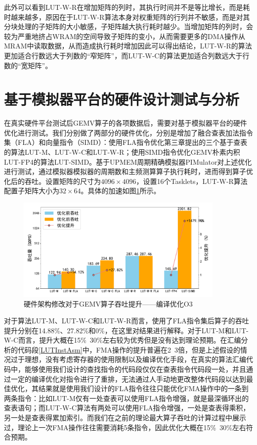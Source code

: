 此外可以看到LUT-W-R在增加矩阵的列时，其执行时间并不是等比增长，而是耗时越来越多，原因在于LUT-W-R算法本身对权重矩阵的行列并不敏感，而是对其分块处理的子矩阵的大小敏感，子矩阵越大执行耗时越少。当增加矩阵的列时，会较为严重地挤占WRAM的空间导致子矩阵的变小，从而需要更多的DMA操作从MRAM中读取数据，从而造成执行耗时增加因此可以得出结论，LUT-W-R的算法更加适合行数远大于列数的“窄矩阵”，而LUT-W-C的算法更加适合列数远大于行数的“宽矩阵”。

\section{基于模拟器平台的硬件设计测试与分析}
在真实硬件平台测试后GEMV算子的各项数据后，需要对基于模拟器平台的硬件优化进行测试。我们分别做了两部分的硬件优化，分别是增加了融合查表加法指令集（FLA）和向量指令（SIMD）：使用FLA指令优化第三章提出的三个基于查表的算法LUT-M、LUT-W-C和LUT-W-R；使用SIMD指令优化GEMV朴素内积LUT-FP4的算法LUT-SIMD。基于UPMEM周期精确模拟器PIMulator对上述优化进行测试，通过模拟器模拟器的周期数和主频测算算子执行耗时，进而得到算子优化后的吞吐。设置矩阵的尺寸为$4096\times 4096$，设置16个Tasklets，LUT-W-R算法配置子矩阵大小为$32\times 64$。具体的加速如图\ref{EXP2-1}所示。

\begin{figure}[!htbp]
    \centering
    \includegraphics[width=0.9\textwidth]{figures/Exp2-1.pdf}
    \caption{硬件架构修改对于GEMV算子吞吐提升——编译优化O3}
	\label{EXP2-1}
\end{figure}

对于算法LUT-M、LUT-W-C和LUT-W-R而言，使用了FLA指令集后算子的吞吐提升分别在14.88\%、27.82\%和0\%，在这里对结果进行解释。对于LUT-M和LUT-W-C而言，提升大概在15\%~30\%左右较为优秀但是没有达到理论预期。在汇编分析的代码段\ref{LUTInstAsm}中，FMA操作的提升普遍在2~3倍，但是上述假设的情况过于理想，没有考虑寄存器的使用限制以及编译优化手段，在真实的算法汇编代码中，能够使用我们设计的查找指令的代码段仅仅在查表指令代码段一处，并且通过一定的编译优化对指令进行了重排，无法通过人手动地更改整体代码段以达到最佳优化，其结果就是使用我们设计的FLA指令往往只能优化FMA操作中的一条到两条指令：比如LUT-M仅有一处查表可以使用FLA指令增强，就是最深循环出的查表语句；而LUT-W-C算法有两处可以使用FLA指令增强，一处是查表得乘积，另一处是查表得累加索引。而我们在之前的理论最大算子吞吐的计算过程中展示过，理论上一次FMA操作往往需要消耗5条指令，因此优化大概在15\%~30\%左右符合预期。

